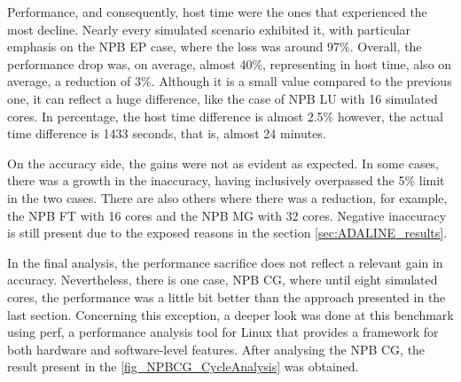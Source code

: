 Performance, and consequently, host time were the ones that experienced the most decline. Nearly every simulated scenario exhibited it, 
with particular emphasis on the NPB EP case, where the loss was around 97\%. Overall, the performance drop was, on average, almost 40\%, 
representing in host time, also on average, a reduction of 3\%. Although it is a small value compared to the previous one, it can reflect a huge 
difference, like the case of NPB LU with 16 simulated cores. In percentage, the host time difference is almost 2.5\% however, 
the actual time difference is 1433 seconds, that is, almost 24 minutes. 

On the accuracy side, the gains were not as evident as expected. In some cases, there was a growth in the inaccuracy, having inclusively overpassed
the 5\% limit in the two cases. There are also others where there was a reduction, for example, the NPB FT with 16 cores and the NPB MG with 32 
cores. Negative inaccuracy is still present due to the exposed reasons in the section \ref{sec:ADALINE_results}. 

In the final analysis, the performance sacrifice does not reflect a relevant gain in accuracy. Nevertheless, there is one case, NPB CG, where until 
eight simulated cores, the performance was a little bit better than the approach presented in the last section. Concerning this exception, a deeper look 
was done at this benchmark using perf, a performance analysis tool for Linux that provides a framework for both hardware and software-level 
features. After analysing the NPB CG, the result present in the \autoref{fig_NPBCG_CycleAnalysis} was obtained. 

